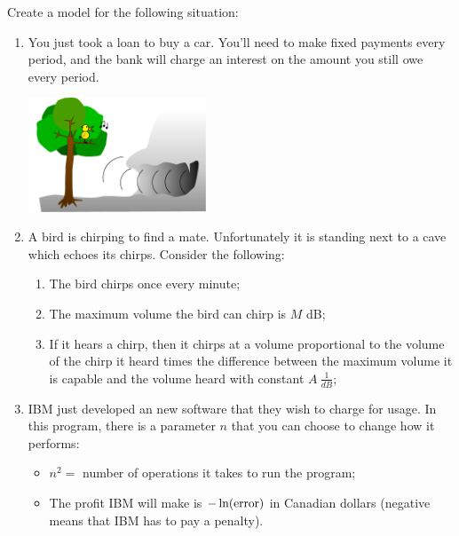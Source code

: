 \begin{exercises}

	\begin{problist}
	\prob Create a model for the following situation:
	\begin{enumerate}
		\item You just took a loan to buy a car. You'll need to make fixed payments every period, and the bank will charge an interest on the amount you still owe every period.

		\begin{center}
			\includegraphics*[width=150pt]{images/module25-chirping-echo.pdf}
		\end{center}

		\item A bird is chirping to find a mate. Unfortunately it is standing next to a cave which echoes its chirps. Consider the following:

 
			\begin{enumerate}[label={(P$_{\arabic*}$) } ]
			\item The bird chirps once every minute;
			\item The maximum volume the bird can chirp is $M$ dB;
			\item If it hears a chirp, then it chirps at a volume proportional to the volume of the chirp it heard times the difference between the maximum volume it is capable and the volume heard with constant $A \ \frac{1}{dB}$;
			\end{enumerate}



		\item IBM just developed an new software that they wish to charge for usage. In this program, there is a parameter $n$ that you can choose to change how it performs:
			\begin{itemize}
			\item $n^2 = $ number of operations it takes to run the program;
			\item The profit IBM will make is $- \ln({\rm error})$ in Canadian dollars (negative means that IBM has to pay a penalty).
			\end{itemize}
	

\end{enumerate}
\end{problist}
\end{exercises}
